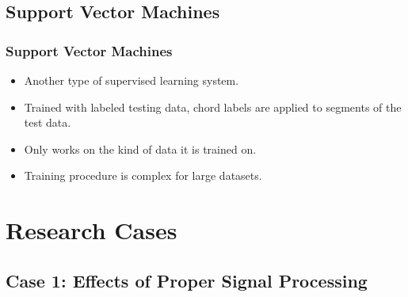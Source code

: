\documentclass{beamer}
\begin{document}
\subsection{Support Vector Machines}

\begin{frame}
	\frametitle{Support Vector Machines}
	\begin{itemize}
		\item Another type of supervised learning system. 
		\item Trained with labeled testing data, chord labels are applied to segments of the test data.
		\item Only works on the kind of data it is trained on. 
		\item Training procedure is complex for large datasets.
	\end{itemize}
\end{frame}

\section[Research Cases]{Research Cases}

\subsection[Case 1: Effects of Proper Signal Processing]{Case 1: Effects of Proper Signal Processing}
\end{document}
